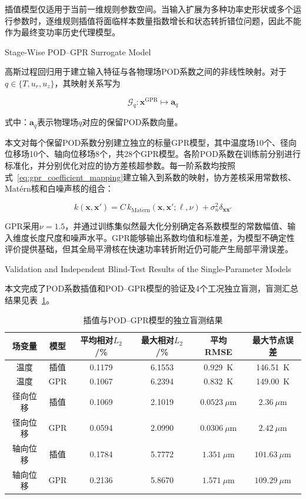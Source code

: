 插值模型仅适用于当前一维规则参数空间。当输入扩展为多种功率史形状或多个运行参数时，逐维规则插值将面临样本数量指数增长和状态转折错位问题，因此不能作为最终变功率历史代理模型。

{Stage-Wise POD--GPR Surrogate Model}

高斯过程回归用于建立输入特征与各物理场POD系数之间的非线性映射。对于$q\in\{T,u_r,u_z\}$，其映射关系写为

\begin{equation}
	\mathcal{G}_{q}:
	\boldsymbol{x}^{\mathrm{GPR}}
	\longmapsto
	\boldsymbol{a}_{q}
	\label{eq:gpr_coefficient_mapping}
\end{equation}

式中：$\boldsymbol{a}_{q}$表示物理场$q$对应的保留POD系数向量。

本文对每个保留POD系数分别建立独立的标量GPR模型，其中温度场10个、径向位移场10个、轴向位移场8个，共28个GPR模型。各阶POD系数在训练前分别进行标准化，并分别优化对应的协方差核超参数。每一阶系数均按照式~\eqref{eq:gpr_coefficient_mapping}建立输入到系数的映射，协方差核采用常数核、Mat\'{e}rn核和白噪声核的组合：

\begin{equation}
	k(\boldsymbol{x},\boldsymbol{x}')
	=
	C\,k_{\mathrm{Mat\acute{e}rn}}
	(\boldsymbol{x},\boldsymbol{x}';\boldsymbol{\ell},\nu)
	+
	\sigma_n^2\delta_{\boldsymbol{x}\boldsymbol{x}'}
	\label{eq:gpr_kernel_complete}
\end{equation}

GPR采用$\nu=1.5$，并通过训练集似然最大化分别确定各系数模型的常数幅值、输入维度长度尺度和噪声水平。GPR能够输出系数均值和标准差，为模型不确定性评价提供基础，但其全局平滑核在快速功率转折附近仍可能产生局部平滑误差。

{Validation and Independent Blind-Test Results of the Single-Parameter Models}

本文完成了POD系数插值和POD--GPR模型的验证及4个工况独立盲测，盲测汇总结果见表~\ref{tab:blind_surrogate_results_complete}。

\begin{table}[htbp]
	\centering
	\caption{插值与POD--GPR模型的独立盲测结果}
	\label{tab:blind_surrogate_results_complete}
	\begin{tabular*}{0.95\textwidth}{
			@{\extracolsep{\fill}}
			cccccc
			@{}
		}
		\toprule
		场变量 & 模型 & 平均相对$L_2$/\% & 最大相对$L_2$/\% & 平均RMSE & 最大节点误差 \\
		\midrule
		温度 & 插值 & 0.1179 & 6.1553 & 0.929~K & 146.51~K \\
		温度 & GPR & 0.1067 & 6.2394 & 0.832~K & 149.00~K \\
		径向位移 & 插值 & 0.1069 & 2.1019 & $0.0523~\mu$m & $2.36~\mu$m \\
		径向位移 & GPR & 0.0594 & 2.0990 & $0.0306~\mu\mathrm{m}$ & $2.42~\mu$m \\
		轴向位移 & 插值 & 0.1784 & 5.7772 & $1.351~\mu\mathrm{m}$ & $101.63~\mu\mathrm{m}$ \\
		轴向位移 & GPR & 0.2136 & 5.8670 & $1.571~\mu$m & $109.29~\mu$m \\
		\bottomrule
	\end{tabular*}
\end{table}

